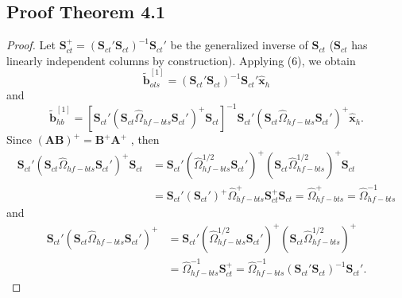 \documentclass[a4paper,11pt]{article}
\newcommand{\bvet}{\bm{b}}
\newcommand{\xvet}{\bm{x}}
\newcommand{\Avet}{\bm{A}}
\newcommand{\Bvet}{\bm{B}}
\newcommand{\Ivet}{\bm{I}}
\newcommand{\Svet}{\bm{S}}
\newcommand{\Omegavet}{\bm{\Omega}}
\theoremstyle{definition}
\newtheorem{theorem}{Theorem}[section]
\begin{document}
{\color{blue}
\subsection{Proof Theorem 4.1}
\begin{proof}
Let $\Svet_{ct}^+ = (\Svet_{ct}'\Svet_{ct})^{-1}\Svet_{ct}'$ be the generalized inverse of $\Svet_{ct}$ ($\Svet_{ct}$ has linearly independent columns by construction). Applying (6), we obtain
$$
\widetilde{\bvet}_{ols}^{[1]} = (\Svet_{ct}'\Svet_{ct})^{-1}\Svet_{ct}' \widehat{\xvet}_{h}
$$
and
$$
\widetilde{\bvet}_{hb}^{[1]} = [\Svet_{ct}'(\Svet_{ct}\widehat{\Omega}_{hf-bts}\Svet_{ct}')^{+}\Svet_{ct}]^{-1}\Svet_{ct}' (\Svet_{ct}\widehat{\Omega}_{hf-bts}\Svet_{ct}')^{+}\widehat{\xvet}_{h} .
$$
Since $(\Avet\Bvet)^+ = \Bvet^+\Avet^+$ \citep{greville1966}, then
\begin{equation}\label{eq:part1}\tag{B.1}
\begin{aligned}
	\Svet_{ct}'(\Svet_{ct}\widehat{\Omega}_{hf-bts}\Svet_{ct}')^{+}\Svet_{ct} &= \Svet_{ct}'(\widehat{\Omega}_{hf-bts}^{1/2}\Svet_{ct}')^{+}(\Svet_{ct}\widehat{\Omega}_{hf-bts}^{1/2})^{+}\Svet_{ct} \\
	&= \Svet_{ct}'(\Svet_{ct}')^{+}\widehat{\Omega}_{hf-bts}^{+}\Svet_{ct}^{+}\Svet_{ct} = \widehat{\Omega}_{hf-bts}^{+} = \widehat{\Omega}_{hf-bts}^{-1}
\end{aligned}
\end{equation}
and
\begin{equation}\label{eq:part2}\tag{B.2}
\begin{aligned}
	\Svet_{ct}' (\Svet_{ct}\widehat{\Omega}_{hf-bts}\Svet_{ct}')^{+} &= \Svet_{ct}'(\widehat{\Omega}_{hf-bts}^{1/2}\Svet_{ct}')^{+}(\Svet_{ct}\widehat{\Omega}_{hf-bts}^{1/2})^{+} \\& = \widehat{\Omega}_{hf-bts}^{-1}\Svet_{ct}^+ = \widehat{\Omega}_{hf-bts}^{-1}(\Svet_{ct}'\Svet_{ct})^{-1}\Svet_{ct}'.

\end{aligned}
\end{equation}
\end{proof}}
\end{document}
